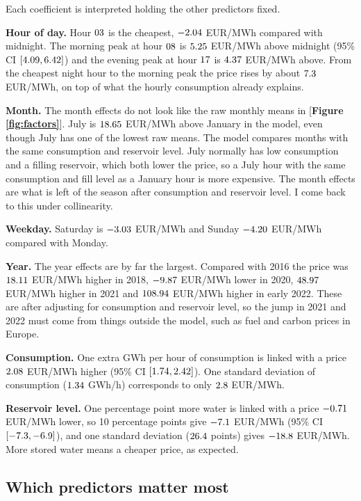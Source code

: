 \documentclass[12pt]{article}
\newcommand{\eur}{EUR/MWh}
\begin{document}
Each coefficient is interpreted holding the other predictors fixed.

\textbf{Hour of day.} Hour $03$ is the cheapest, $-2.04$ \eur{} compared with midnight. The morning peak at hour $08$ is $5.25$ \eur{} above midnight (95\% CI $[4.09, 6.42]$) and the evening peak at hour $17$ is $4.37$ \eur{} above. From the cheapest night hour to the morning peak the price rises by about $7.3$ \eur{}, on top of what the hourly consumption already explains.

\textbf{Month.} The month effects do not look like the raw monthly means in [\textbf{Figure \ref{fig:factors}}]. July is $18.65$ \eur{} above January in the model, even though July has one of the lowest raw means. The model compares months with the same consumption and reservoir level. July normally has low consumption and a filling reservoir, which both lower the price, so a July hour with the same consumption and fill level as a January hour is more expensive. The month effects are what is left of the season after consumption and reservoir level. I come back to this under collinearity.

\textbf{Weekday.} Saturday is $-3.03$ \eur{} and Sunday $-4.20$ \eur{} compared with Monday.

\textbf{Year.} The year effects are by far the largest. Compared with 2016 the price was $18.11$ \eur{} higher in 2018, $-9.87$ \eur{} lower in 2020, $48.97$ \eur{} higher in 2021 and $108.94$ \eur{} higher in early 2022. These are after adjusting for consumption and reservoir level, so the jump in 2021 and 2022 must come from things outside the model, such as fuel and carbon prices in Europe.

\textbf{Consumption.} One extra GWh per hour of consumption is linked with a price $2.08$ \eur{} higher (95\% CI $[1.74, 2.42]$). One standard deviation of consumption ($1.34$ GWh/h) corresponds to only $2.8$ \eur.

\textbf{Reservoir level.} One percentage point more water is linked with a price $-0.71$ \eur{} lower, so 10 percentage points give $-7.1$ \eur{} (95\% CI $[-7.3, -6.9]$), and one standard deviation ($26.4$ points) gives $-18.8$ \eur. More stored water means a cheaper price, as expected.

\subsection{Which predictors matter most}
\end{document}
